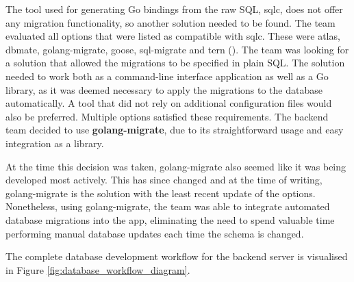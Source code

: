 The tool used for generating Go bindings from the raw SQL, sqlc, does not offer
any migration functionality, so another solution needed to be found. The team
evaluated all options that were listed as compatible with sqlc. These were
atlas, dbmate, golang-migrate, goose, sql-migrate and tern
(\cite{sqlc_updating_database_schema}). The team was looking for a solution that
allowed the migrations to be specified in plain SQL. The solution needed to work
both as a command-line interface application as well as a Go library, as it was
deemed necessary to apply the migrations to the database automatically. A tool
that did not rely on additional configuration files would also be preferred.
Multiple options satisfied these requirements. The backend team decided to use
\textbf{golang-migrate}, due to its straightforward usage and easy integration as a
library.

At the time this decision was taken, golang-migrate also seemed like it was
being developed most actively. This has since changed and at the time of
writing, golang-migrate is the solution with the least recent update of the
options. Nonetheless, using golang-migrate, the team was able to integrate
automated database migrations into the app, eliminating the need to spend
valuable time performing manual database updates each time the schema is
changed.

The complete database development workflow for the backend server is visualised
in Figure \ref{fig:database_workflow_diagram}.

